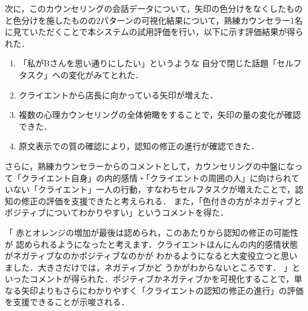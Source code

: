 \documentclass[shuuron]{kuee}
\begin{document}
%


次に，このカウンセリングの会話データについて，矢印の色分けをなくしたものと色分けを施したものの2パターンの可視化結果について，熟練カウンセラー1名に見ていただくことで本システムの試用評価を行い，以下に示す評価結果が得られた．
\begin{enumerate}

  \item 「私がBさんを思い通りにしたい」というような
  自分で閉じた話題「セルフタスク」への変化がみてとれた．
  \item クライエントから店長に向かっている矢印が増えた．
  \item 複数の心理カウンセリングの全体俯瞰をすることで，矢印の量の変化が確認できた．
  \item 原文表示での質の確認により，認知の修正の進行が確認できた．
\end{enumerate}

さらに，熟練カウンセラーからのコメントとして，カウンセリングの中盤になって「クライエント自身」の内的感情・「クライエントの周囲の人」に向けられていない「クライエント」一人の行動，すなわちセルフタスクが増えたことで，認知の修正の評価を支援できたと考えられる．
また，「色付きの方がネガティブとポジティブについてわかりやすい」というコメントを得た．


「
赤とオレンジの増加が最後は認められ，このあたりから認知の修正の可能性が
認められるようになったと考えます．クライエントほんにんの内的感情状態がネガティブなのかポジティブなのかが
わかるようになると大変役立つと思いました．大きさだけでは，ネガティブかど
うかがわからないところです．
」といったコメントが得られた．ポジティブかネガティブかを可視化することで，単なる矢印よりもさらにわかりやすく「クライエントの認知の修正の進行」の評価を支援できることが示唆される．
\end{document}
